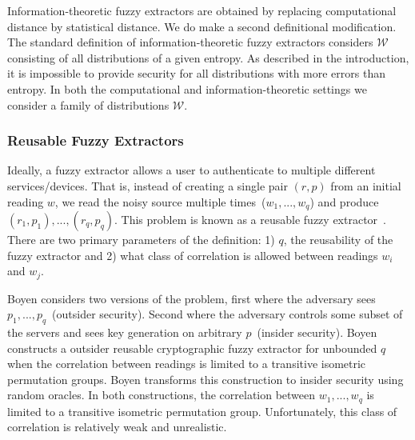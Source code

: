 \documentclass[11pt]{article}
\begin{document}
Information-theoretic fuzzy extractors are obtained by replacing computational distance by statistical distance.  We do make a second definitional modification.  The standard definition of information-theoretic fuzzy extractors considers $\mathcal{W}$  consisting of all distributions of a given entropy.  As described in the introduction, it is impossible to provide security for all distributions with more errors than entropy.  In both the computational and information-theoretic settings we consider a family of distributions $\mathcal{W}$.

\subsubsection{Reusable Fuzzy Extractors}
\label{sec:reusable}

Ideally, a fuzzy extractor allows a user to authenticate to multiple different services/devices.  That is, instead of creating a single pair $(r, p)$ from an initial reading $w$, we read the noisy source multiple times~($w_1,..., w_q$) and produce $(r_1, p_1),..., (r_q, p_q)$.  This problem is known as a reusable fuzzy extractor~\cite{Boyen2004}.  There are two primary parameters of the definition: 1) $q$, the reusability of the fuzzy extractor and 2) what class of correlation is allowed between readings $w_i$ and $w_j$.  

Boyen considers two versions of the problem, first where the adversary sees $p_1,..., p_q$~(outsider security).  Second where the adversary controls some subset of the servers and sees key generation on arbitrary $p$~(insider security).  
Boyen constructs a outsider reusable cryptographic fuzzy extractor for unbounded $q$ when the correlation between readings is limited to a transitive isometric permutation groups. Boyen transforms this construction to insider security using random oracles. In both constructions, the correlation between  $w_1,..., w_q$ is limited to a transitive isometric permutation group.  Unfortunately, this class of correlation is relatively weak and unrealistic.
\end{document}
